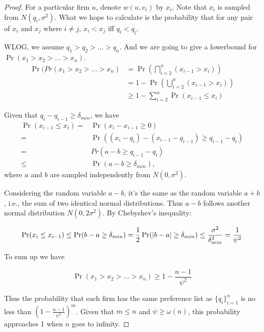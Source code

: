 \begin{proof}
    For a particular firm $u$, %
    denote $w(u, v_i)$ by $x_i$. Note that $x_i$ is sampled from $N(q_i, {\sigma}^2)$.
    What we hope to calculate is the probability that
    for any pair of $x_i$ and $x_j$ where $i \neq j$, $x_i < x_j$ iff $q_i < q_j$.

    WLOG, we assume $q_1 > q_2 > ... > q_n$. And we are going to give a lowerbound
    for $\Pr(x_1 > x_2 > \dots > x_n)$.
    \begin{align*}
        \Pr(Pr(x_1 > x_2 > \dots > x_n)
        & = \Pr(\bigcap_{i=2}^{n} (x_{i-1} > x_i)) \\
        & = 1 - \Pr(\bigcup_{i=2}^{n} (x_{i-1} > x_i)) \\
        & \ge 1 - \sum_{i=2}^{n} \Pr(x_{i - 1} \le x_i)
    \end{align*}

    Given that $q_i - q_{i-1} \ge \delta_{min}$,
    we have
    \begin{align*}
    \Pr(x_{i-1} \le x_i) = & \Pr (x_i - x_{i-1} \geq 0) \\
    = & \Pr((x_i - q_i) - (x_{i-1} - q_{i-1}) \geq q_{i-1} - q_i) \\
    = & Pr(a-b \geq q_{i-1} - q_i) \\
    \leq & \Pr(a-b \geq \delta_{min}),
    \end{align*}
    where $a$ and $b$ are sampled independently from $N(0, \sigma^2)$.

    Considering the random variable $a-b$, it's the same as the random variable $a+b$, i.e.,
    the sum of two identical normal distributions.
    Thus $a-b$ follows another normal distribution $N(0, 2\sigma^2)$.
    By Chebyshev's inequality:

    $$\Pr(x_i \le x_{i - 1}) \le \Pr(b - a \ge \delta_{min})
    = \frac{1}{2} \Pr(\left\vert b-a\right\vert \ge \delta_{min}) \le \frac{\sigma^2}{\delta_{min}^2} = \frac{1}{\psi^2}$$

    To sum up we have

    $$\Pr(x_1 > x_2 > \dots > x_n) \ge 1 - \frac{n - 1}{\psi^2}$$

    Thus the probability that each firm has the same preference list as $\{q_i\}_{i=1}^{n}$
     is no less than $(1 - \frac{n-1}{\psi^2})^m$.
    Given that $m \le n$ and $\psi \ge \omega(n)$, this probability
    approaches 1 when $n$ goes to infinity.
\end{proof}

